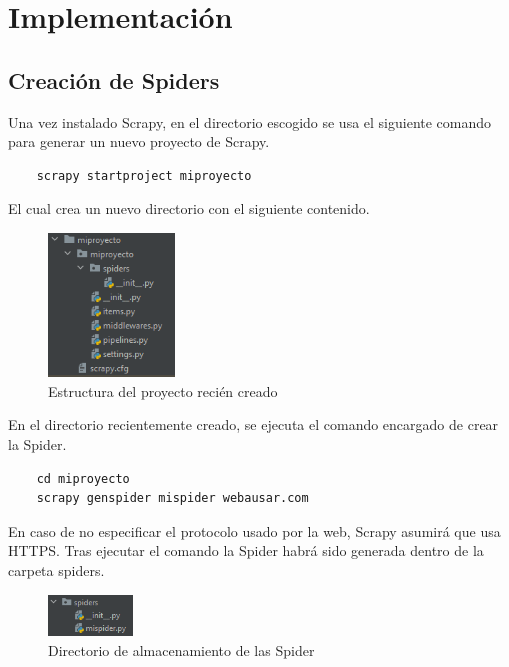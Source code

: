 \chapter[Implementación]{Implementación}
\label{Chap5}

\section{Creación de Spiders}
Una vez instalado Scrapy, en el directorio escogido se usa el siguiente comando para generar un nuevo proyecto de Scrapy.

\begin{lstlisting}
	scrapy startproject miproyecto
\end{lstlisting}

El cual crea un nuevo directorio con el siguiente contenido.

\begin{figure} [h!]
	\centering
	\includegraphics[width=0.3\textwidth]{fig/estructura_proyecto_scrapy.png}
	\caption[Estructura del proyecto recién creado]{Estructura del proyecto recién creado}
	\label{fig:ej11}
\end{figure}

En el directorio recientemente creado, se ejecuta el comando encargado de crear la Spider.

\begin{lstlisting}
	cd miproyecto
	scrapy genspider mispider webausar.com
\end{lstlisting}

En caso de no especificar el protocolo usado por la web, Scrapy asumirá que usa HTTPS.\newline
\newline
Tras ejecutar el comando la Spider habrá sido generada dentro de la carpeta spiders.

\begin{figure} [h!]
	\centering
	\includegraphics[width=0.2\textwidth]{fig/primera_spider.png}
	\caption[Directorio de almacenamiento de las Spider]{Directorio de almacenamiento de las Spider}
	\label{fig:ej12}
\end{figure}

